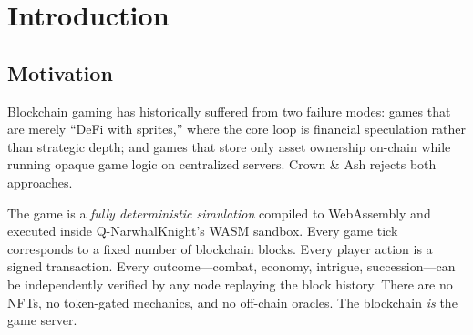 \documentclass[a4paper, 11pt]{article}
\begin{document}
\begin{abstract}
\noindent
Crown \& Ash is a deterministic medieval grand strategy game that executes
entirely within the Q-NarwhalKnight blockchain's WASM sandbox. The simulation
manages 25 provinces across 7 factions, with full character dynasties,
espionage, combat, economy, religion, and narrative generation---all using
fixed-point arithmetic (\texttt{i64} $\times$ 1000) to guarantee identical
results on every node. A 10+ phase tick pipeline processes one game turn per
10 blockchain blocks, while a 4-tier narrative cascade enriches events from
raw data through template prose to optional LLM-generated dialog. The game
client is built on Bevy 0.15 with ECS architecture and egui panels,
connected via Server-Sent Events. This paper describes the system
architecture, simulation mechanics, security model, and client design in
sufficient detail to reproduce the implementation.
\end{abstract}

\tableofcontents
\newpage

\section{Introduction}
\label{sec:intro}

\subsection{Motivation}

Blockchain gaming has historically suffered from two failure modes: games
that are merely ``DeFi with sprites,'' where the core loop is financial
speculation rather than strategic depth; and games that store only asset
ownership on-chain while running opaque game logic on centralized servers.
Crown \& Ash rejects both approaches.

The game is a \emph{fully deterministic simulation} compiled to WebAssembly
and executed inside Q-NarwhalKnight's WASM sandbox. Every game tick
corresponds to a fixed number of blockchain blocks. Every player action is a
signed transaction. Every outcome---combat, economy, intrigue, succession---can
be independently verified by any node replaying the block history. There are
no NFTs, no token-gated mechanics, and no off-chain oracles. The blockchain
\emph{is} the game server.
\end{document}
